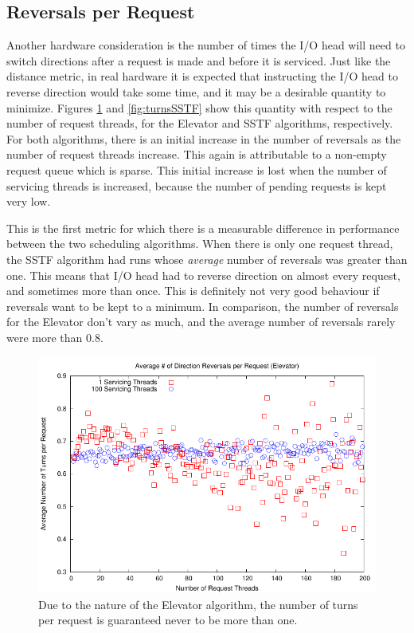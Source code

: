 \documentclass{report}
\begin{document}
\subsection{Reversals per Request}
Another hardware consideration is the number of times the I/O head will need to switch
directions after a request is made and before it is serviced. Just like the distance
metric, in real hardware it is expected that instructing the I/O head to reverse direction
would take some time, and it may be a desirable quantity to minimize. Figures
\ref{fig:turnsElevator} and \ref{fig:turnsSSTF} show this quantity with respect to the 
number of request threads, for the Elevator and SSTF algorithms, respectively.
For both algorithms, there is an initial increase in the number of reversals as the number
of request threads increase. This again is attributable to a non-empty request queue which
is sparse. This initial increase is lost when the number of servicing threads is
increased, because the number of pending requests is kept very low.

This is the first metric for which there is a measurable difference in performance between
the two scheduling algorithms. When
there is only one request thread, the SSTF algorithm had runs whose \emph{average} number
of reversals was greater than one. This means that I/O head had to reverse direction on
almost every request, and sometimes more than once. This is definitely not very good
behaviour if reversals want to be kept to a minimum. In comparison, the number of reversals
for the Elevator don't vary as much, and the average number of reversals rarely were more
than 0.8.
\newpage
\begin{figure}[htb]
    \centering
    \includegraphics[scale=1]{turnsElevator.pdf}
    \caption{Due to the nature of the Elevator algorithm, the number of turns per request
    is guaranteed never to be more than one.}
    \label{fig:turnsElevator}
\end{figure}
\end{document}
